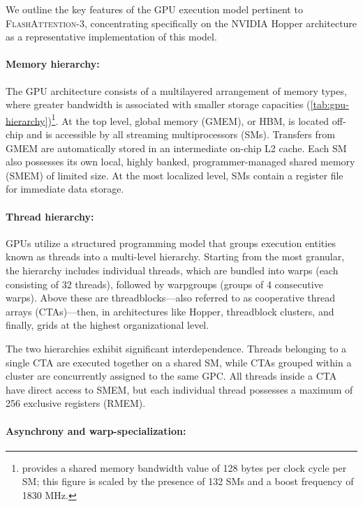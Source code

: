 We outline the key features of the GPU execution model pertinent to \textsc{FlashAttention-3}, concentrating specifically on the NVIDIA Hopper architecture as a representative implementation of this model.

\paragraph{Memory hierarchy:} The GPU architecture consists of a multilayered arrangement of memory types, where greater bandwidth is associated with smaller storage capacities (\cref{tab:gpu-hierarchy})\footnote{\citet{luo2024benchmarking} provides a shared memory bandwidth value of 128 bytes per clock cycle per SM; this figure is scaled by the presence of 132 SMs and a boost frequency of 1830 MHz.}. At the top level, global memory (GMEM), or HBM, is located off-chip and is accessible by all streaming multiprocessors (SMs). Transfers from GMEM are automatically stored in an intermediate on-chip L2 cache. Each SM also possesses its own local, highly banked, programmer-managed shared memory (SMEM) of limited size. At the most localized level, SMs contain a register file for immediate data storage.

\paragraph{Thread hierarchy:} GPUs utilize a structured programming model that groups execution entities known as threads into a multi-level hierarchy. Starting from the most granular, the hierarchy includes individual threads, which are bundled into warps (each consisting of 32 threads), followed by warpgroups (groups of 4 consecutive warps). Above these are threadblocks—also referred to as cooperative thread arrays (CTAs)—then, in architectures like Hopper, threadblock clusters, and finally, grids at the highest organizational level.

The two hierarchies exhibit significant interdependence. Threads belonging to a single CTA are executed together on a shared SM, while CTAs grouped within a cluster are concurrently assigned to the same GPC. All threads inside a CTA have direct access to SMEM, but each individual thread possesses a maximum of 256 exclusive registers (RMEM).

\paragraph{Asynchrony and warp-specialization:}

